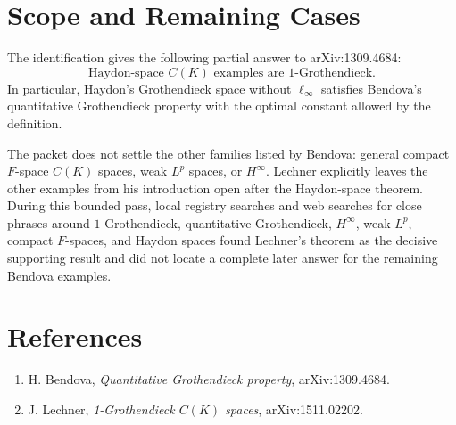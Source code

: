 \documentclass[11pt]{article}
\begin{document}
\section*{Scope and Remaining Cases}

The identification gives the following partial answer to arXiv:1309.4684:
\[
  \boxed{\text{Haydon-space } C(K) \text{ examples are } 1
  \text{-Grothendieck}.}
\]
In particular, Haydon's Grothendieck space without \(\ell_\infty\) satisfies
Bendova's quantitative Grothendieck property with the optimal constant allowed
by the definition.

The packet does not settle the other families listed by Bendova: general
compact \(F\)-space \(C(K)\) spaces, weak \(L^p\) spaces, or \(H^\infty\).
Lechner explicitly leaves the other examples from his introduction open after
the Haydon-space theorem. During this bounded pass, local registry searches and
web searches for close phrases around \(1\)-Grothendieck, quantitative
Grothendieck, \(H^\infty\), weak \(L^p\), compact \(F\)-spaces, and Haydon
spaces found Lechner's theorem as the decisive supporting result and did not
locate a complete later answer for the remaining Bendova examples.

\section*{References}

\begin{enumerate}
\item H. Bendova, \emph{Quantitative Grothendieck property},
  arXiv:1309.4684.
\item J. Lechner, \emph{1-Grothendieck \(C(K)\) spaces},
  arXiv:1511.02202.
\end{enumerate}
\end{document}
